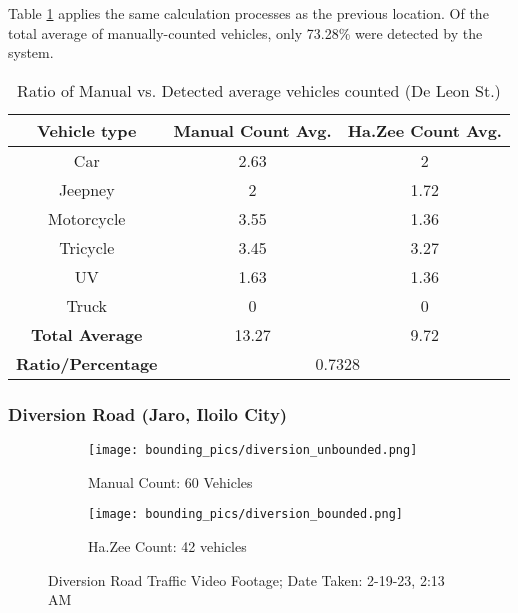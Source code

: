 Table \ref{tab:de_leon} applies the same calculation processes as the previous location. Of the total average of manually-counted vehicles, only 73.28\% were detected by the system. 



\begin{table}[ht]   %
	\centering
	\caption{Ratio of Manual vs. Detected average vehicles counted  (De Leon St.)} \vspace{0.25em}
	\begin{tabular}{c|c|c} \hline
		\centering \textbf {Vehicle type} & \textbf{Manual Count Avg.} & \textbf{Ha.Zee Count Avg.}\\ \hline
		Car & 2.63 & 2    \\ 
		Jeepney & 2 & 1.72  	\\ 
		Motorcycle& 3.55  & 1.36  \\ 
		Tricycle   & 3.45  & 3.27  \\ 
		UV & 1.63 & 1.36  \\ 
		Truck & 0 & 0 \\ \hline
		
		\textbf{Total Average} &13.27 & 9.72   \\ \hline
		
		\textbf{Ratio/Percentage} & \multicolumn{2}{c}{0.7328}  \\ \hline
		
	\end{tabular}
	\label{tab:de_leon}
\end{table}

\subsubsection{Diversion Road (Jaro, Iloilo City)
}


\begin{figure}[!htbp]
	\begin{subfigure}{.5\textwidth}
		\centering
		\texttt{[image: bounding\_pics/diversion\_unbounded.png]}
		\caption{Manual Count: 60 Vehicles}
		
	\end{subfigure}%
	\begin{subfigure}{.5\textwidth}
		\centering
		\texttt{[image: bounding\_pics/diversion\_bounded.png]}
		\caption{Ha.Zee Count: 42 vehicles}
	\end{subfigure}
	\caption{Diversion Road Traffic Video Footage; Date Taken: 2-19-23, 2:13 AM}
	\label{fig:diversion}
\end{figure}
\FloatBarrier

